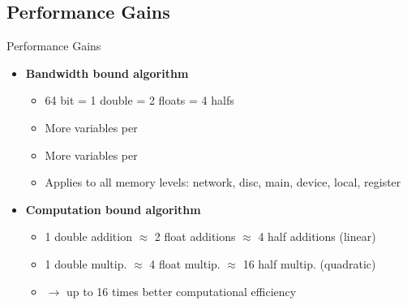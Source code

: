 \documentclass[10pt]{beamer}
\begin{document}
\subsection{Performance Gains}
\begin{frame}{Performance Gains}
\begin{itemize}
\item \textbf{Bandwidth bound algorithm}
	\begin{itemize}
	\item 64 bit = 1 double = 2 floats = 4 halfs
	\item More variables per \color{red}{bandwidth}\color{black}
	\item More variables per \color{red}{storage}\color{black}
	\item Applies to all memory levels: network, disc, main, device, 
			local, register
	\end{itemize}
\item \textbf{Computation bound algorithm}
	\begin{itemize}
	\item 1 double addition $\approx$ 2 float additions $\approx$ 4 half 
			additions (linear)
	\item 1 double multip. $\approx$ 4 float multip. $\approx$ 16 
			half multip. (quadratic)
	\item $\rightarrow$ up to 16 times better computational efficiency
	\end{itemize}
\end{itemize}
\end{frame}
\end{document}
